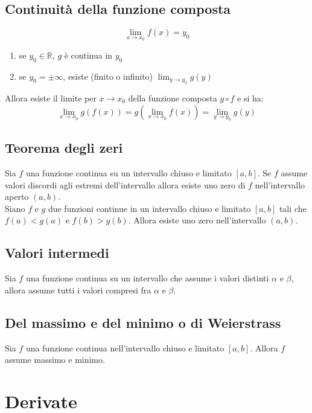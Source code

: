 \documentclass[12pt, a4paper]{report}
\begin{document}
    \section{Continuità della funzione composta}
    \begin{equation*}
        \lim_{x\to x_{0}}f(x)=y_{0}
    \end{equation*}
    \begin{enumerate}
        \item se $y_{0}\in \mathbb{R}$, $g$ è continua in $y_{0}$
        \item se $y_{0}=\pm\infty$, esiste (finito o infinito) $\lim_{y\to y_{0}}g(y)$
    \end{enumerate}
    Allora esiste il limite per $x\to x_{0}$ della funzione composta $g\circ f$ e si ha:
    \begin{equation*}
        \lim_{x\to x_{0}}g(f(x))=g(\lim_{x\to x_{0}}f(x))=\lim_{y\to y_{0}}g(y)
    \end{equation*}
    \section{Teorema degli zeri}
    Sia $f$ una funzione continua su un intervallo chiuso e limitato $[a,b]$. Se $f$ assume valori discordi agli estremi dell'intervallo allora esiste uno zero di $f$ nell'intervallo aperto $(a,b)$.\\
    Siano $f$ e $g$ due funzioni continue in un intervallo chiuso e limitato $[a,b]$ tali che $f(a)<g(a)$ e $f(b)>g(b)$. Allora esiste uno zero nell'intervallo $(a,b)$.
    \section{Valori intermedi}
    Sia $f$ una funzione continua su un intervallo che assume i valori distinti $\alpha$ e $\beta$, allora assume tutti i  valori compresi fra $\alpha$ e $\beta$.
    \section{Del massimo e del minimo o di Weierstrass}
    Sia $f$ una funzione continua nell'intervallo chiuso e limitato $[a,b]$. Allora $f$ assume massimo e minimo.
    \chapter{Derivate}
\end{document}
